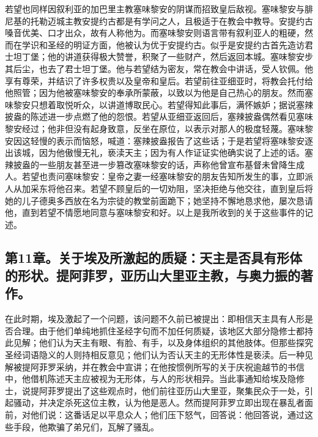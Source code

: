 若望也同样因叙利亚的加巴里主教塞味黎安的阴谋而招致皇后敌视。塞味黎安与腓尼基的托勒迈城主教安提约古都是有学问之人，且极适于在教会中教导。安提约古嗓音优美、口才出众，故有人称他为。而塞味黎安则语言带有叙利亚人的粗硬，然而在学识和圣经的明证方面，他被认为优于安提约古。似乎是安提约古首先造访君士坦丁堡；他的讲道获得极大赞誉，积聚了一些财产，然后返回本城。塞味黎安步其后尘，也去了君士坦丁堡。他与若望结为密友，常在教会中讲话，受人钦佩。他享有尊荣，并结识了许多权贵以及皇帝和皇后。若望前往亚细亚时，将教会托付给他照管；因为他被塞味黎安的奉承所蒙蔽，以致以为他是自己热心的朋友。然而塞味黎安只想着取悦听众，以讲道博取民心。若望得知此事后，满怀嫉妒；据说塞辣披盎的陈述进一步点燃了他的怨恨。若望从亚细亚返回后，塞辣披盎偶然看见塞味黎安经过；他非但没有起身致意，反坐在原位，以表示对那人的极度轻蔑。塞味黎安因这轻慢的表示而恼怒，喊道：塞辣披盎报告了这些话；于是若望将塞味黎安逐出该城，因为他傲慢无礼，亵渎天主；因为有人作证证实他确实说了上述的话。塞辣披盎的一些朋友甚至进一步篡改塞味黎安的话，声称他曾宣布基督未曾降生成人。若望也责问塞味黎安：皇帝之妻一经塞味黎安的朋友告知所发生的事，立即派人从加采东将他召来。若望不顾皇后的一切劝阻，坚决拒绝与他交往，直到皇后将她的儿子德奥多西放在名为宗徒的教堂前面跪下；她坚持不懈地恳求他，屡次恳请他，直到若望不情愿地同意与塞味黎安和好。以上是我所收到的关于这些事件的记述。\par


\subsection{第11章。关于埃及所激起的质疑：天主是否具有形体的形状。提阿菲罗，亚历山大里亚主教，与奥力振的著作。}

在此时期，埃及激起了一个问题，该问题不久前已被提出：即相信天主具有人形是否合理。由于他们单纯地抓住圣经字句而不加任何质疑，该地区大部分隐修士都持此见解；他们认为天主有眼、有脸、有手，以及身体组织的其他肢体。但那些探究圣经词语隐义的人则持相反意见；他们认为否认天主的无形体性是亵渎。后一种见解被提阿菲罗采纳，并在教会中宣讲；在他按惯例所写的关于庆祝逾越节的书信中，他借机陈述天主应被视为无形体，与人的形状相异。当此事通知给埃及隐修士，说提阿菲罗提出了这些观点时，他们前往亚历山大里亚，聚集民众于一处，引起骚动，并决定杀死这位主教，认为他是恶人。然而提阿菲罗立即出现在暴乱者面前，对他们说：这番话足以平息众人；他们压下怒气，回答说：他回答说，通过这些手段，他欺骗了弟兄们，瓦解了骚乱。\par

